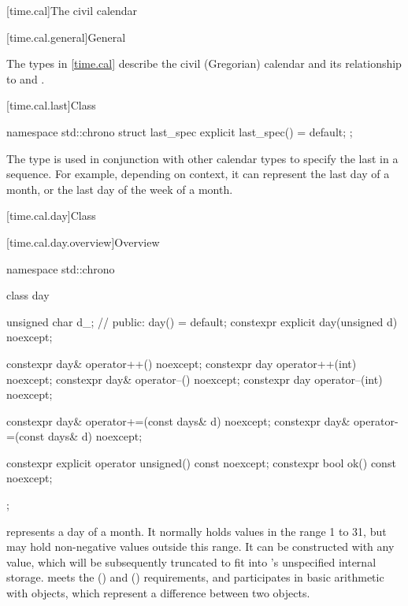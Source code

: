 [time.cal]{The civil calendar}

[time.cal.general]{General}

\pnum
The types in \ref{time.cal} describe the civil (Gregorian) calendar
and its relationship to  and .

[time.cal.last]{Class }
%

\begin{codeblock}
namespace std::chrono {
  struct last_spec {
    explicit last_spec() = default;
  };
}
\end{codeblock}

\pnum
The type  is used
in conjunction with other calendar types
to specify the last in a sequence.
For example, depending on context,
it can represent the last day of a month,
or the last day of the week of a month.

[time.cal.day]{Class }

[time.cal.day.overview]{Overview}

\begin{codeblock}
namespace std::chrono {
  class day {
    unsigned char d_;           // \expos
  public:
    day() = default;
    constexpr explicit day(unsigned d) noexcept;

    constexpr day& operator++()    noexcept;
    constexpr day  operator++(int) noexcept;
    constexpr day& operator--()    noexcept;
    constexpr day  operator--(int) noexcept;

    constexpr day& operator+=(const days& d) noexcept;
    constexpr day& operator-=(const days& d) noexcept;

    constexpr explicit operator unsigned() const noexcept;
    constexpr bool ok() const noexcept;
  };
}
\end{codeblock}

\pnum
{} represents a day of a month.
It normally holds values in the range 1 to 31,
but may hold non-negative values outside this range.
It can be constructed with any  value,
which will be subsequently truncated to fit into 's unspecified internal storage.
 meets the  ()
and  () requirements,
and participates in basic arithmetic with  objects,
which represent a difference between two  objects.

